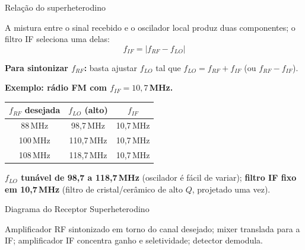 \begin{frame}{Relação do superheterodino}

A mistura entre o sinal recebido e o oscilador local produz duas componentes; o filtro IF seleciona uma delas:
\[
\boxed{\;f_{IF} = |f_{RF} - f_{LO}|\;}
\]

\pause
\textbf{Para sintonizar $f_{RF}$:} basta ajustar $f_{LO}$ tal que $f_{LO} = f_{RF} + f_{IF}$ (ou $f_{RF} - f_{IF}$).

\pause
\textbf{Exemplo: rádio FM com $f_{IF} = 10{,}7$\,MHz.}
\begin{center}
\footnotesize
\begin{tabular}{ccc}
\toprule
$f_{RF}$ desejada & $f_{LO}$ (alto) & $f_{IF}$ \\
\midrule
88\,MHz   & 98{,}7\,MHz   & 10{,}7\,MHz \\
100\,MHz  & 110{,}7\,MHz  & 10{,}7\,MHz \\
108\,MHz  & 118{,}7\,MHz  & 10{,}7\,MHz \\
\bottomrule
\end{tabular}
\end{center}

\textbf{$f_{LO}$ tunável de 98,7 a 118,7\,MHz} (oscilador é fácil de variar); \textbf{filtro IF fixo em 10,7\,MHz} (filtro de cristal/cerâmico de alto $Q$, projetado uma vez).

\end{frame}


\begin{frame}{Diagrama do Receptor Superheterodino}

\begin{center}
\end{center}

\small Amplificador RF sintonizado em torno do canal desejado; mixer translada para a IF; amplificador IF concentra ganho e seletividade; detector demodula.

\end{frame}

